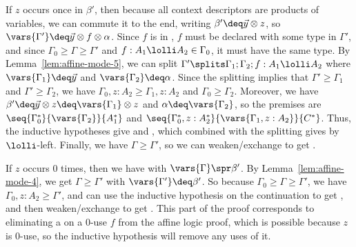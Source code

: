 \begin{itemize}
  If $z$ occurs once in $\beta'$, then because all context descriptors
  are products of variables, we can commute it to the end, writing
  $\beta' \deq \vec{y} \otimes z$, so $\vars{\Gamma'} \deq \vec{y}
  \otimes f \otimes \alpha$.  Since $f$ is in , $f$ must
  be declared with some type in $\Gamma'$, and since $\Gamma_0 \ge
  \Gamma \ge \Gamma'$ and $f:A_1 \lolli A_2 \in \Gamma_0$, it must have
  the same type.  By Lemma~\ref{lem:affine-mode-5}, we can split
  $\Gamma' \splits \Gamma_1;\Gamma_2;f:A_1 \lolli A_2$ where
  $\vars{\Gamma_1} \deq \vec{y}$ and $\vars{\Gamma_2} \deq \alpha$.
  Since the splitting implies that $\Gamma' \ge \Gamma_1$ and $\Gamma'
  \ge \Gamma_2$, we have $\Gamma_0,z:A_2 \ge \Gamma_1,z:A_2$ and
  $\Gamma_0 \ge \Gamma_2$.  Moreover, we have $\beta' \deq \vec{y}
  \otimes z \deq \vars{\Gamma_1} \otimes z$ and $\alpha \deq
  \vars{\Gamma_2}$, so the premises are
  $\seq{\Gamma_0^*}{\vars{\Gamma_2}}{A_1^*}$ and
  $\seq{\Gamma_0^*,z:A_2^*}{\vars{\Gamma_1,z:A_2}}{C^*}$.  Thus, the
  inductive hypotheses give  and
  , which combined with the splitting gives
   by $\lolli$-left.  Finally, we have $\Gamma \ge
  \Gamma'$, so we can weaken/exchange to get .

  If $z$ occurs 0 times, then we have
   with $\vars{\Gamma} \spr \beta'$.
  By Lemma~\ref{lem:affine-mode-4}, we get $\Gamma \ge \Gamma'$ with
  $\vars{\Gamma'} \deq \beta'$. So because $\Gamma_0 \ge \Gamma \ge
  \Gamma'$, we have $\Gamma_0,z:A_2 \ge \Gamma'$, and can use the
  inductive hypothesis on the continuation to get , and
  then weaken/exchange to get . This part of the proof
  corresponds to eliminating a \UL\/ on a 0-use $f$ from the affine
  logic proof, which is possible because $z$ is 0-use, so the inductive
  hypothesis will remove any uses of it.
\end{itemize}

